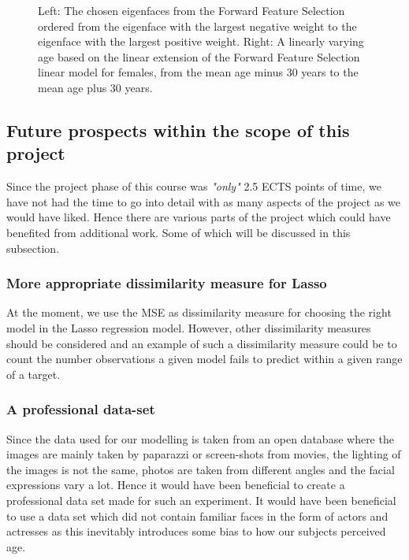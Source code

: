 \begin{figure}[ht!]
\begin{minipage}{0.49\textwidth}
    \end{minipage}
    \caption{Left: The chosen eigenfaces from the Forward Feature Selection ordered from the eigenface with the largest negative weight to the eigenface with the largest positive weight. Right: A linearly varying age based on the linear extension of the Forward Feature Selection linear model for females, from the mean age minus 30 years to the mean age plus 30 years.}
    \label{fig:F_fs}
\end{figure}

\subsection{Future prospects within the scope of this project}
Since the project phase of this course was \textit{"only"} 2.5 ECTS points of time, we have not had the time to go into detail with as many aspects of the project as we would have liked. Hence there are various parts of the project which could have benefited from additional work. Some of which will be discussed in this subsection.
\subsubsection{More appropriate dissimilarity measure for Lasso}
At the moment, we use the MSE as dissimilarity measure for choosing the right model in the Lasso regression model. However, other dissimilarity measures should be considered and an example of such a dissimilarity measure could be to count the number observations a given model fails to predict within a given range of a target. 

\subsubsection{A professional data-set}
Since the data used for our modelling is taken from an open database where the images are mainly taken by paparazzi or screen-shots from movies, the lighting of the images is not the same, photos are taken from different angles and the facial expressions vary a lot. Hence it would have been beneficial to create a professional data set made for such an experiment. It would have been beneficial to use a data set which did not contain familiar faces in the form of actors and actresses as this inevitably introduces some bias to how our subjects perceived age.